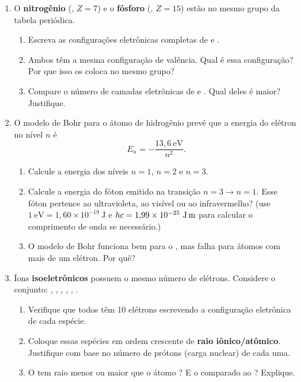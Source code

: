 \documentclass[10pt,a4paper]{article}
\begin{document}
\begin{enumerate}[resume]
\item O \textbf{nitrogênio} (, $Z=7$) e o
  \textbf{fósforo} (, $Z=15$) estão no mesmo grupo da
  tabela periódica.
  \begin{enumerate}
    \item Escreva as configurações eletrônicas completas de
           e .
    \item Ambos têm a mesma configuração de valência.
          Qual é essa configuração? Por que isso os coloca no
          mesmo grupo?
    \item Compare o número de camadas eletrônicas de 
          e . Qual deles é maior? Justifique.
  \end{enumerate}

\item O modelo de Bohr para o átomo de hidrogênio prevê que a
  energia do elétron no nível $n$ é
  \[
    E_n = -\frac{13{,}6~\text{eV}}{n^2}.
  \]
  \begin{enumerate}
    \item Calcule a energia dos níveis $n=1$, $n=2$ e $n=3$.
    \item Calcule a energia do fóton emitido na transição
          $n=3 \to n=1$. Esse fóton pertence ao ultravioleta,
          ao visível ou ao infravermelho? (use
          $1~\text{eV} = 1{,}60\times10^{-19}~\text{J}$ e
          $hc = 1{,}99\times10^{-25}~\text{J\,m}$ para calcular
          o comprimento de onda se necessário.)
    \item O modelo de Bohr funciona bem para o , mas
          falha para átomos com mais de um elétron. Por quê?
  \end{enumerate}

\item Íons \textbf{isoeletrônicos} possuem o mesmo número de
  elétrons. Considere o conjunto:
  , , , , ,
  .
  \begin{enumerate}
    \item Verifique que todos têm 10 elétrons escrevendo a
          configuração eletrônica de cada espécie.
    \item Coloque essas espécies em ordem crescente de
          \textbf{raio iônico/atômico}. Justifique com base
          no número de prótons (carga nuclear) de cada uma.
    \item O  tem raio menor ou maior que o átomo
          ? E o  comparado ao ? Explique.
  \end{enumerate}

\end{enumerate}
\end{document}
